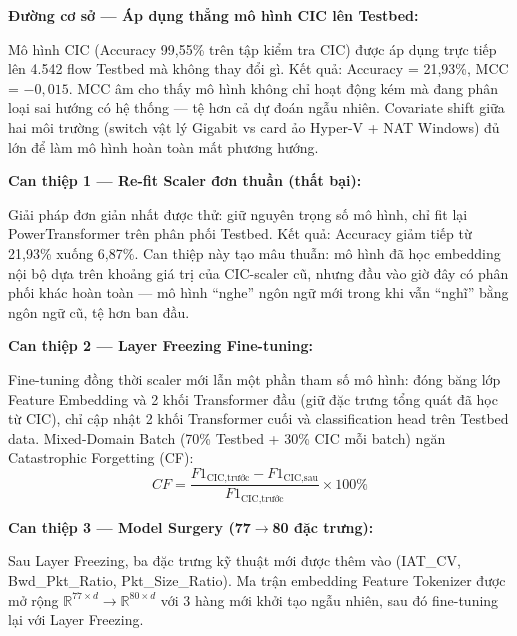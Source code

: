 \documentclass[../DoAn.tex]{subfiles}
\begin{document}
\textbf{Đường cơ sở --- Áp dụng thẳng mô hình CIC lên Testbed:}

Mô hình CIC (Accuracy 99,55\% trên tập kiểm tra CIC) được áp dụng trực tiếp lên 4.542 flow Testbed mà không thay đổi gì. Kết quả: Accuracy = 21,93\%, MCC = $-0{,}015$. MCC âm cho thấy mô hình không chỉ hoạt động kém mà đang phân loại sai hướng có hệ thống --- tệ hơn cả dự đoán ngẫu nhiên. Covariate shift giữa hai môi trường (switch vật lý Gigabit vs card ảo Hyper-V + NAT Windows) đủ lớn để làm mô hình hoàn toàn mất phương hướng.

\textbf{Can thiệp 1 --- Re-fit Scaler đơn thuần (thất bại):}

Giải pháp đơn giản nhất được thử: giữ nguyên trọng số mô hình, chỉ fit lại PowerTransformer trên phân phối Testbed. Kết quả: Accuracy giảm tiếp từ 21,93\% xuống 6,87\%. Can thiệp này tạo mâu thuẫn: mô hình đã học embedding nội bộ dựa trên khoảng giá trị của CIC-scaler cũ, nhưng đầu vào giờ đây có phân phối khác hoàn toàn --- mô hình ``nghe'' ngôn ngữ mới trong khi vẫn ``nghĩ'' bằng ngôn ngữ cũ, tệ hơn ban đầu.

\textbf{Can thiệp 2 --- Layer Freezing Fine-tuning:}

Fine-tuning đồng thời scaler mới lẫn một phần tham số mô hình: đóng băng lớp Feature Embedding và 2 khối Transformer đầu (giữ đặc trưng tổng quát đã học từ CIC), chỉ cập nhật 2 khối Transformer cuối và classification head trên Testbed data. Mixed-Domain Batch (70\% Testbed + 30\% CIC mỗi batch) ngăn Catastrophic Forgetting (CF):
\begin{equation}
    CF = \frac{F1_{\text{CIC,trước}} - F1_{\text{CIC,sau}}}{F1_{\text{CIC,trước}}} \times 100\%
    \label{eq:cf-def}
\end{equation}

\textbf{Can thiệp 3 --- Model Surgery (77$\to$80 đặc trưng):}

Sau Layer Freezing, ba đặc trưng kỹ thuật mới được thêm vào (IAT\_CV, Bwd\_Pkt\_Ratio, Pkt\_Size\_Ratio). Ma trận embedding Feature Tokenizer được mở rộng $\mathbb{R}^{77 \times d} \to \mathbb{R}^{80 \times d}$ với 3 hàng mới khởi tạo ngẫu nhiên, sau đó fine-tuning lại với Layer Freezing.
\end{document}
